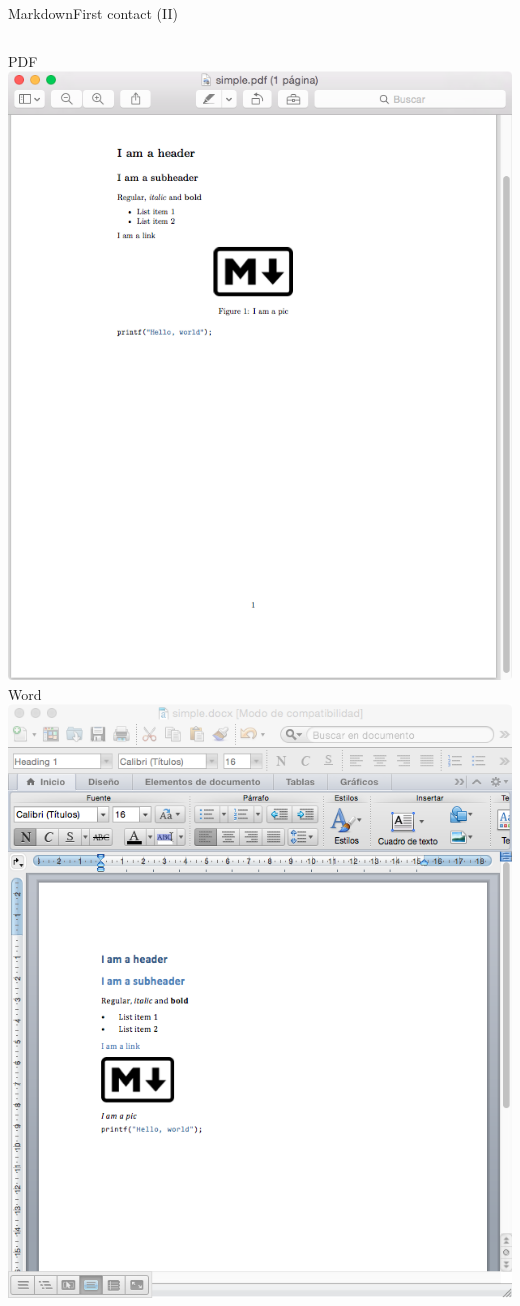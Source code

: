 \documentclass{beamer}
\begin{document}

\begin{frame}[plain]{Markdown}{First contact (II)}
 \begin{columns}
     \column{0.3\dimexpr\paperwidth-10pt}
	 	\centering PDF\\
		\includegraphics[height=\linewidth]{figs/pdf.png} 
     \column{0.3\dimexpr\paperwidth-10pt}
	 	\centering Word\\
		\includegraphics[height=\linewidth]{figs/docx.png} 

\end{columns}
\end{frame}
\end{document}
